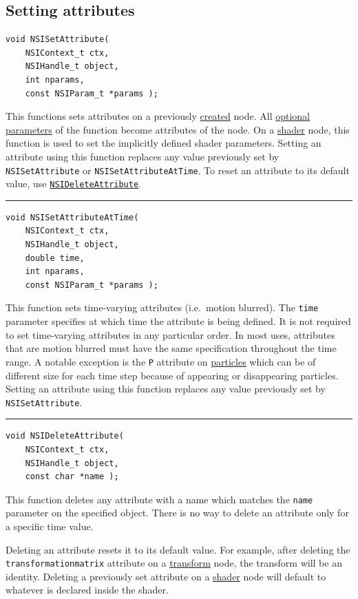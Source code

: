 \documentclass[oneside,ebook]{memoir}
\newcommand*{\smallrule}{\begin{center}\rule{3cm}{.1pt}\end{center}}
\begin{document}
\subsection{Setting attributes}
\label{CAPI:nsisetattribute}
\label{CAPI:nsisetattributeattime}
\begin{lstlisting}[style=CAPI]
void NSISetAttribute(
	NSIContext_t ctx,
	NSIHandle_t object,
	int nparams,
	const NSIParam_t *params );
\end{lstlisting}
This functions sets attributes on a previously \hyperref[CAPI:nsicreate]{created} node. All \hyperref[CAPI:optionalparam]{optional parameters} of the function become attributes of the node. On a \hyperref[section:shadernode]{shader} node, this function is used to set the implicitly defined shader parameters.
Setting an attribute using this function replaces any value previously set by \lstinline|NSISetAttribute| or \lstinline|NSISetAttributeAtTime|.
To reset an attribute to its default value, use \hyperref[CAPI:nsideleteattribute]{\lstinline|NSIDeleteAttribute|}.
\smallrule
\begin{lstlisting}[style=CAPI]
void NSISetAttributeAtTime(
	NSIContext_t ctx,
	NSIHandle_t object,
	double time,
	int nparams,
	const NSIParam_t *params );
\end{lstlisting}
This function sets time-varying attributes (i.e.\ motion blurred). The \lstinline|time| parameter specifies at which time the attribute is being defined. It is not required  to set time-varying attributes in any particular order. In most uses, attributes that are motion blurred must have the same specification throughout the time range. A notable exception is the \lstinline|P| attribute on \hyperref[section:particlesnode]{particles} which can be of different size for each time step because of appearing or disappearing particles.
Setting an attribute using this function replaces any value previously set by \lstinline|NSISetAttribute|.
\smallrule
\label{CAPI:nsideleteattribute}
\begin{lstlisting}[style=CAPI]
void NSIDeleteAttribute(
	NSIContext_t ctx,
	NSIHandle_t object,
	const char *name );
\end{lstlisting}
This function deletes any attribute with a name which matches the \lstinline|name| parameter on the specified object. There is no way to delete an attribute only for a specific time value.

Deleting an attribute resets it to its default value.
For example, after deleting the \lstinline|transformationmatrix| attribute on a \hyperref[section:transformnode]{transform} node, the transform will be an identity.
Deleting a previously set attribute on a \hyperref[section:shadernode]{shader} node will default to whatever is declared inside the shader.
\end{document}
